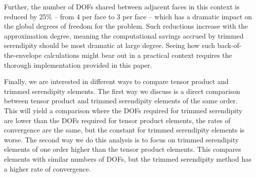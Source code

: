 \documentclass[format=acmsmall,screen,timestamp=false,a4paper]{acmart}
\newcommand\akg[1]{\textbf{\textcolor[rgb]{.5,0,1}{[Andrew: #1]}}}
\newcommand{\calS}{\mathcal{S}}
\begin{document}
   Further, the number of DOFs shared between adjacent faces in this context is reduced by 25\% -- from 4 per face to 3 per face -- which has a dramatic impact on the global degrees of freedom for the problem.
   Such reductions increase with the approximation degree, meaning the computational savings accrued by trimmed serendipity should be most dramatic at large degree.  
   Seeing how such back-of-the-envelope calculations might bear out in a practical context requires the thorough implementation provided in this paper.
   
  Finally, we are interested in different ways to compare tensor product and trimmed serendipity elements.  The first way we discuss is a direct comparison between tensor product and trimmed serendipity elements of the same order.  This will yield a comparison where the DOFs required for trimmed serendipity are lower than the DOFs required for tensor product elements, the rates of convergence are the same, but the constant for trimmed serendipity elements is worse.  The second way we do this analysis is to focus on trimmed serendipity elements of one order higher than the tensor product elements.  This compares elements with similar numbers of DOFs, but the trimmed serendipity method has a higher rate of convergence.

   
   
   
   
\end{document}
